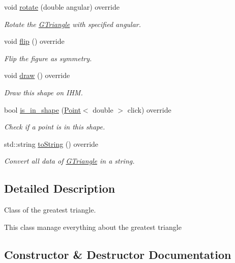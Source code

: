 \begin{DoxyCompactItemize}
void \hyperlink{classGTriangle_ae3ed75bbad4ba7fed68bc06c5834cfbe}{rotate} (double angular) override
\begin{DoxyCompactList}\small\item\em Rotate the \hyperlink{classGTriangle}{G\+Triangle} with specified angular. \end{DoxyCompactList}\item 
\mbox{\label{classGTriangle_ab223d049ce2518095201b99c8940e724}} 
void \hyperlink{classGTriangle_ab223d049ce2518095201b99c8940e724}{flip} () override
\begin{DoxyCompactList}\small\item\em Flip the figure as symmetry. \end{DoxyCompactList}\item 
\mbox{\label{classGTriangle_adb7a211b65860ce4dfcc13275cd5052d}} 
void \hyperlink{classGTriangle_adb7a211b65860ce4dfcc13275cd5052d}{draw} () override
\begin{DoxyCompactList}\small\item\em Draw this shape on I\+HM. \end{DoxyCompactList}\item 
bool \hyperlink{classGTriangle_a7e5d4eefbb2e42b9c3142096a23dcb19}{is\+\_\+in\+\_\+shape} (\hyperlink{classPoint}{Point}$<$ double $>$ click) override
\begin{DoxyCompactList}\small\item\em Check if a point is in this shape. \end{DoxyCompactList}\item 
std\+::string \hyperlink{classGTriangle_a8381aeea39fac0d52ad9e0d45b791b3b}{to\+String} () override
\begin{DoxyCompactList}\small\item\em Convert all data of \hyperlink{classGTriangle}{G\+Triangle} in a string. \end{DoxyCompactList}\end{DoxyCompactItemize}


\subsection{Detailed Description}
Class of the greatest triangle. 

This class manage everything about the greatest triangle 

\subsection{Constructor \& Destructor Documentation}
\mbox{\label{classGTriangle_a969f76093f398cda98268aba05d57336}} 
